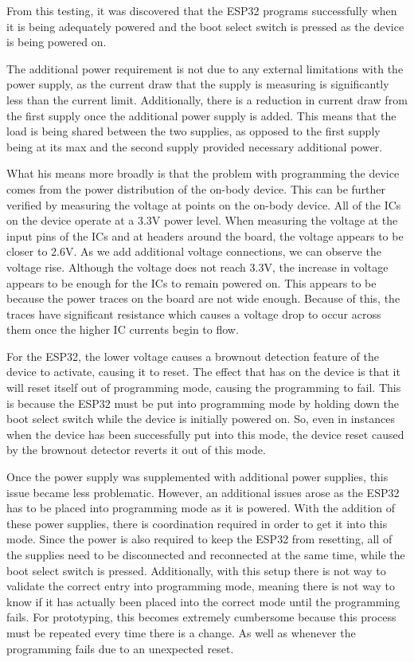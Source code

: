 From this testing, it was discovered that the ESP32 programs successfully when it is being adequately powered
and the boot select switch is pressed as the device is being powered on.

The additional power requirement is not due to any external limitations with the power supply,
as the current draw that the supply is measuring is significantly less than the current limit.
Additionally, there is a reduction in current draw from the first supply once the additional power supply is added.
This means that the load is being shared between the two supplies,
as opposed to the first supply being at its max and the second supply provided necessary additional power.

What his means more broadly is that the problem with programming the device comes from the power distribution of the on-body device.
This can be further verified by measuring the voltage at points on the on-body device.
All of the ICs on the device operate at a 3.3V power level.
When measuring the voltage at the input pins of the ICs and at headers around the board, the voltage appears to be closer to 2.6V.
As we add additional voltage connections, we can observe the voltage rise.
Although the voltage does not reach 3.3V, the increase in voltage appears to be enough for the ICs to remain powered on.
This appears to be because the power traces on the board are not wide enough.
Because of this, the traces have significant resistance which causes a voltage drop to occur across them once the higher IC currents begin to flow.

For the ESP32, the lower voltage causes a brownout detection feature of the device to activate, causing it to reset.
The effect that has on the device is that it will reset itself out of programming mode, causing the programming to fail.
This is because the ESP32 must be put into programming mode by holding down the boot select switch while the device is initially powered on.
So, even in instances when the device has been successfully put into this mode,
the device reset caused by the brownout detector reverts it out of this mode.

Once the power supply was supplemented with additional power supplies, this issue became less problematic.
However, an additional issues arose as the ESP32 has to be placed into programming mode as it is powered.
With the addition of these power supplies, there is coordination required in order to get it into this mode.
Since the power is also required to keep the ESP32 from resetting, all of the supplies need to be disconnected and reconnected at the same time,
while the boot select switch is pressed.
Additionally, with this setup there is not way to validate the correct entry into programming mode,
meaning there is not way to know if it has actually been placed into the correct mode until the programming fails.
For prototyping, this becomes extremely cumbersome because this process must be repeated every time there is a change.
As well as whenever the programming fails due to an unexpected reset.

